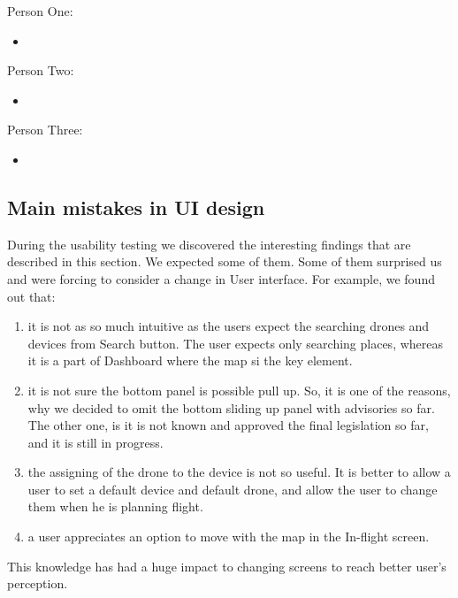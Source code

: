 Person One:
\begin{itemize}
    \item %
\end{itemize}
Person Two:
\begin{itemize}
    \item %
\end{itemize}
Person Three:
\begin{itemize}
    \item %
\end{itemize}


\subsection{Main mistakes in UI design}\label{subsec:main-mistakes-in-ui-design}
During the usability testing we discovered the interesting findings that are described in this section.
We expected some of them.
Some of them surprised us and were forcing to consider a change in User interface.
For example, we found out that:
\begin{enumerate}
    \item it is not as so much intuitive as the users expect the searching drones and devices from Search button.
    The user expects only searching places, whereas it is a part of Dashboard where the map si the key element.
    \item it is not sure the bottom panel is possible pull up.
    So, it is one of the reasons, why we decided to omit the bottom sliding up panel with advisories so far.
    The other one, is it is not known and approved the final legislation so far, and it is still in progress.
    \item the assigning of the drone to the device is not so useful.
    It is better to allow a user to set a default device and default drone, and allow the user to change them when he is planning flight.
    \item a user appreciates an option to move with the map in the In-flight screen.
\end{enumerate}
This knowledge has had a huge impact to changing screens to reach better user's perception.
